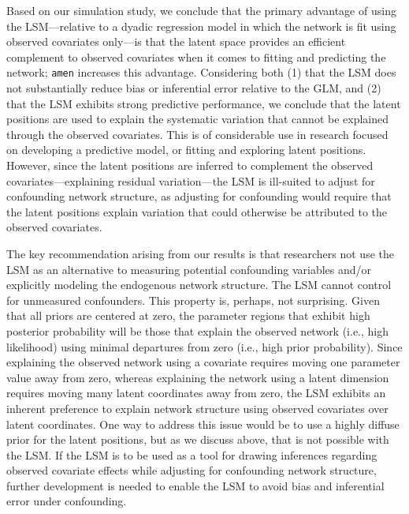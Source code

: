 \documentclass[11pt]{article}
\begin{document}
Based on our simulation study, we conclude that the primary advantage of using the LSM---relative to a dyadic regression model in which the network is fit using observed covariates only---is that the latent space provides an efficient complement to observed covariates when it comes to fitting and predicting the network; \texttt{amen} increases this advantage.
Considering both (1) that the LSM does not substantially reduce bias or inferential error relative to the GLM, and (2) that the LSM exhibits strong predictive performance, we conclude that the latent positions are used to explain the systematic variation that cannot be explained through the observed covariates. This is of considerable use in research focused on developing a predictive model, or fitting and exploring latent positions. However, since the latent positions are inferred to complement the observed covariates---explaining residual variation---the LSM is ill-suited to adjust for confounding network structure, as adjusting for confounding would require that the latent positions explain variation that could otherwise be attributed to the observed covariates.

The key recommendation arising from our results is that researchers not use the LSM as an alternative to measuring potential confounding variables and/or explicitly modeling the endogenous network structure. The LSM cannot control for unmeasured confounders. This property is, perhaps, not surprising. Given that all priors are centered at zero, the parameter regions that exhibit high posterior probability will be those that explain the observed network (i.e., high likelihood) using minimal departures from zero (i.e., high prior probability). Since explaining the observed network using a covariate requires moving one parameter value away from zero, whereas explaining the network using a latent dimension requires moving many latent coordinates away from zero, the LSM exhibits an inherent preference to explain network structure using observed covariates over latent coordinates. One way to address this issue would be to use a highly diffuse prior for the latent positions, but as we discuss above, that is not possible with the LSM. If the LSM is to be used as a tool for drawing inferences regarding observed covariate effects while adjusting for confounding network structure, further development is needed to enable the LSM to avoid bias and inferential error under confounding.

\newpage



\end{document}
